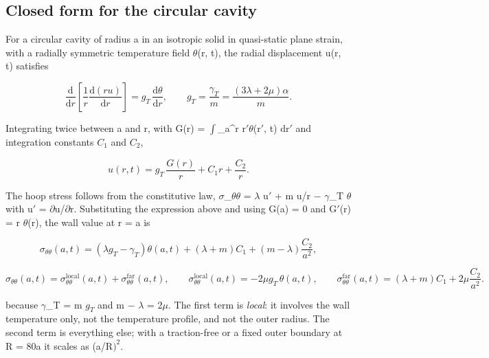 \documentclass[preprint,12pt]{elsarticle}
\begin{document}
\subsection{Closed form for the circular cavity}
\label{sec:4.2}

For a circular cavity of radius a in an isotropic solid in quasi-static plane strain, with a radially symmetric temperature field $\theta$(r, t), the radial displacement u(r, t) satisfies

\begin{equation}
\frac{\mathrm{d}}{\mathrm{d}r}\left[\frac{1}{r}\frac{\mathrm{d}(ru)}{\mathrm{d}r}\right]=g_T\,\frac{\mathrm{d}\theta}{\mathrm{d}r},\qquad g_T=\frac{\gamma_T}{m}=\frac{(3\lambda+2\mu)\alpha}{m}. 
\label{eq:9}
\end{equation}

Integrating twice between a and r, with G(r) = $\int$\_a^r r$'\theta$(r$'$, t) dr$'$ and integration constants $C_{1}$ and $C_{2}$,

\begin{equation}
u(r,t)=g_T\,\frac{G(r)}{r}+C_1 r+\frac{C_2}{r}. 
\label{eq:10}
\end{equation}

The hoop stress follows from the constitutive law, $\sigma$\_$\theta \theta$ = $\lambda$ u$'$ + m u/r $-$ $\gamma$\_T $\theta$ with u$'$ = $\partial$u/$\partial$r. Substituting the expression above and using G(a) = 0 and G$'$(r) = r $\theta$(r), the wall value at r = a is

\begin{equation}
\sigma_{\theta\theta}(a,t)=\left(\lambda g_T-\gamma_T\right)\theta(a,t)+(\lambda+m)C_1+(m-\lambda)\frac{C_2}{a^2}, 
\label{eq:11}
\end{equation}

\begin{equation}
\sigma_{\theta\theta}(a,t)=\sigma_{\theta\theta}^{\mathrm{local}}(a,t)+\sigma_{\theta\theta}^{\mathrm{far}}(a,t),\qquad\sigma_{\theta\theta}^{\mathrm{local}}(a,t)=-2\mu g_T\,\theta(a,t),\qquad\sigma_{\theta\theta}^{\mathrm{far}}(a,t)=(\lambda+m)C_1+2\mu\frac{C_2}{a^2}. 
\label{eq:12}
\end{equation}

because $\gamma$\_T = m $g_{T}$ and m $-$ $\lambda$ = 2$\mu$. The first term is \emph{local}: it involves the wall temperature only, not the temperature profile, and not the outer radius. The second term is everything else; with a traction-free or a fixed outer boundary at R = 80a it scales as (a/R$)^{2}$.
\end{document}
